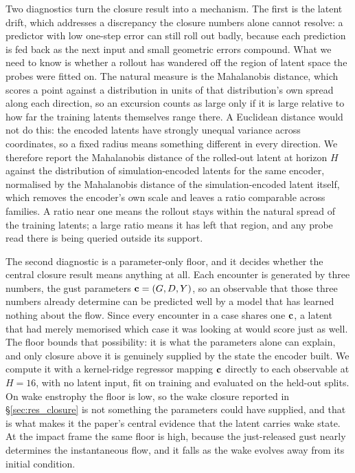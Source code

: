 Two diagnostics turn the closure result into a mechanism. The first is the latent drift, which addresses a discrepancy the closure numbers alone cannot resolve: a predictor with low one-step error can still roll out badly, because each prediction is fed back as the next input and small geometric errors compound. What we need to know is whether a rollout has wandered off the region of latent space the probes were fitted on. The natural measure is the Mahalanobis distance, which scores a point against a distribution in units of that distribution's own spread along each direction, so an excursion counts as large only if it is large relative to how far the training latents themselves range there. A Euclidean distance would not do this: the encoded latents have strongly unequal variance across coordinates, so a fixed radius means something different in every direction. We therefore report the Mahalanobis distance of the rolled-out latent at horizon $H$ against the distribution of simulation-encoded latents for the same encoder, normalised by the Mahalanobis distance of the simulation-encoded latent itself, which removes the encoder's own scale and leaves a ratio comparable across families. A ratio near one means the rollout stays within the natural spread of the training latents; a large ratio means it has left that region, and any probe read there is being queried outside its support.\re

The second diagnostic is a parameter-only floor, and it decides whether the central closure result means anything at all. Each encounter is generated by three numbers, the gust parameters $\mathbf{c} = (G,D,Y)$, so an observable that those three numbers already determine can be predicted well by a model that has learned nothing about the flow. Since every encounter in a case shares one $\mathbf{c}$, a latent that had merely memorised which case it was looking at would score just as well. The floor bounds that possibility: it is what the parameters alone can explain, and only closure above it is genuinely supplied by the state the encoder built. We compute it with a kernel-ridge regressor mapping $\mathbf{c}$ directly to each observable at $H = 16$, with no latent input, fit on training and evaluated on the held-out splits. On wake enstrophy the floor is low, so the wake closure reported in \S\ref{sec:res_closure} is not something the parameters could have supplied, and that is what makes it the paper's central evidence that the latent carries wake state. At the impact frame the same floor is high, because the just-released gust nearly determines the instantaneous flow, and it falls as the wake evolves away from its initial condition.\re

